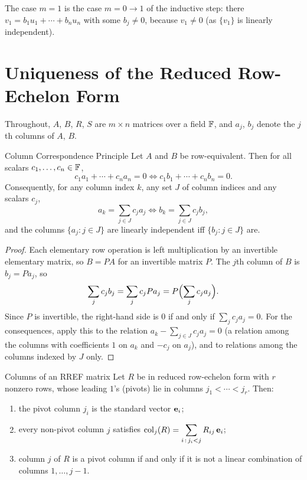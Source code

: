 \documentclass{exam}
\begin{document}
\begin{remark}
  The case $m = 1$ is the case $m = 0 \to 1$ of the inductive step: there $v_1 = b_1 u_1 + \cdots + b_n u_n$ with some $b_j \neq 0$, because $v_1 \neq 0$ (as $\{v_1\}$ is linearly independent).
\end{remark}

\section{Uniqueness of the Reduced Row-Echelon Form}

Throughout, $A$, $B$, $R$, $S$ are $m \times n$ matrices over a field $\mathbb F$, and $a_j$, $b_j$ denote the $j$th columns of $A$, $B$.

\begin{lma}{Column Correspondence Principle}
  Let $A$ and $B$ be row-equivalent. Then for all scalars $c_1, \dots, c_n \in \mathbb F$,
  \[
    c_1 a_1 + \cdots + c_n a_n = 0 \iff c_1 b_1 + \cdots + c_n b_n = 0.
  \]
  Consequently, for any column index $k$, any set $J$ of column indices and any scalars $c_j$,
  \[
    a_k = \sum_{j \in J} c_j a_j \iff b_k = \sum_{j \in J} c_j b_j,
  \]
  and the columns $\{a_j : j \in J\}$ are linearly independent iff $\{b_j : j \in J\}$ are.
\end{lma}

\begin{proof}
  Each elementary row operation is left multiplication by an invertible elementary matrix, so $B = PA$ for an invertible matrix $P$. The $j$th column of $B$ is $b_j = P a_j$, so
  \[
    \sum_j c_j b_j = \sum_j c_j P a_j = P\Bigl(\sum_j c_j a_j\Bigr).
  \]
  Since $P$ is invertible, the right-hand side is $0$ if and only if $\sum_j c_j a_j = 0$. For the consequences, apply this to the relation $a_k - \sum_{j \in J} c_j a_j = 0$ (a relation among the columns with coefficients $1$ on $a_k$ and $-c_j$ on $a_j$), and to relations among the columns indexed by $J$ only.
\end{proof}

\begin{lma}{Columns of an RREF matrix}
  Let $R$ be in reduced row-echelon form with $r$ nonzero rows, whose leading $1$'s (pivots) lie in columns $j_1 < \cdots < j_r$. Then:
  \begin{enumerate}[label=(\roman*)]
    \item the pivot column $j_i$ is the standard vector $\mathbf{e}_i$;
    \item every non-pivot column $j$ satisfies $\displaystyle \operatorname{col}_j(R) = \sum_{i \,:\, j_i < j} R_{ij}\, \mathbf{e}_i$;
    \item column $j$ of $R$ is a pivot column if and only if it is not a linear combination of columns $1, \dots, j - 1$.
  \end{enumerate}
\end{lma}
\end{document}
